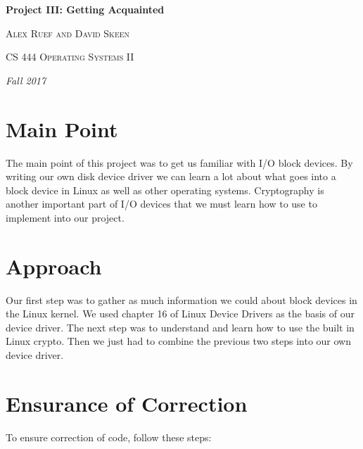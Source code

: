 \documentclass[10pt,drafclsnofoot,onecolumn]{article}
\begin{document}
               
\begin{titlepage}
\centering
{\huge\bfseries Project III: Getting Acquainted\par}
\vspace{.5cm}
{\scshape Alex Ruef and David Skeen \par}
\vspace{.5cm}   
{\scshape CS 444 Operating Systems II\par}
\vspace{.5cm} 
{\Large\itshape Fall 2017\par}
\par
\par
\begin{abstract}
In this project we are instructed with creating our own RAM disk device driver.
We must also use Linux's crypto API to encrypt and decrypt our block device.
The device driver must be written as a module that can be moved into a running VM.
In doing so we will learn more about I/O devices and how they interact with the Linux kernel.

\end{abstract}
\end{titlepage}

\section{Main Point}
The main point of this project was to get us familiar with I/O block devices.
By writing our own disk device driver we can learn a lot about what goes into a block device in Linux as well as other operating systems.
Cryptography is another important part of I/O devices that we must learn how to use to implement into our project.

\section{Approach}
Our first step was to gather as much information we could about block devices in the Linux kernel.
We used chapter 16 of Linux Device Drivers as the basis of our device driver.
The next step was to understand and learn how to use the built in Linux crypto.
Then we just had to combine the previous two steps into our own device driver.

\section{Ensurance of Correction}
To ensure correction of code, follow these steps:
\end{document}
